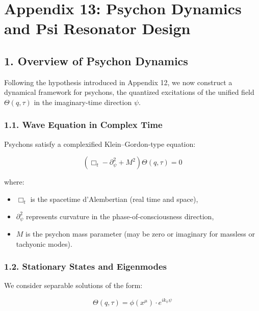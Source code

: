 

\section*{Appendix 13: Psychon Dynamics and Psi Resonator Design}


\ConsciousnessDisclaimer

\subsection*{1. Overview of Psychon Dynamics}

Following the hypothesis introduced in Appendix 12, we now construct a dynamical framework for psychons, 
the quantized excitations of the unified field \(\Theta(q, \tau)\) in the imaginary-time direction \(\psi\).

\subsubsection*{1.1. Wave Equation in Complex Time}

Psychons satisfy a complexified Klein–Gordon-type equation:

\[
\left( \Box_t - \partial_\psi^2 + M^2 \right) \Theta(q, \tau) = 0
\]

where:
\begin{itemize}
  \item \(\Box_t\) is the spacetime d'Alembertian (real time and space),
  \item \(\partial_\psi^2\) represents curvature in the phase-of-consciousness direction,
  \item \(M\) is the psychon mass parameter (may be zero or imaginary for massless or tachyonic modes).
\end{itemize}

\subsubsection*{1.2. Stationary States and Eigenmodes}

We consider separable solutions of the form:

\[
\Theta(q, \tau) = \phi(x^\mu) \cdot e^{i k_\psi \psi}
\]

